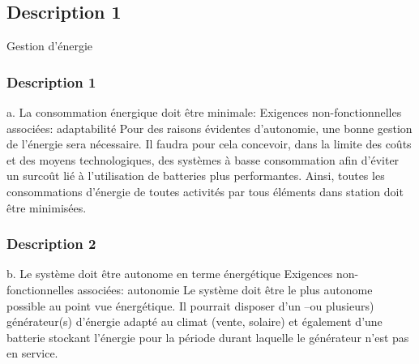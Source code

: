 \subsection {Description 1}Gestion d'énergie
\subsubsection {Description 1}
a. La consommation énergique doit être minimale:
 Exigences non-fonctionnelles associées: adaptabilité 
Pour des raisons évidentes d'autonomie,  une bonne gestion de l'énergie sera nécessaire. Il faudra pour cela concevoir, dans la limite des coûts et des moyens technologiques, des systèmes à basse consommation afin d'éviter un surcoût lié à l'utilisation de batteries plus performantes. Ainsi, toutes les consommations d’énergie de toutes activités par tous éléments dans station doit être minimisées.  

\subsubsection {Description 2}
b. Le système doit être autonome en terme énergétique 
Exigences non-fonctionnelles associées: autonomie
Le système doit être le plus autonome possible au point vue énergétique. Il pourrait disposer d’un –ou plusieurs) générateur(s) d’énergie adapté au climat (vente, solaire) et également d’une batterie stockant l'énergie pour la période durant laquelle le générateur n'est pas en service. 

